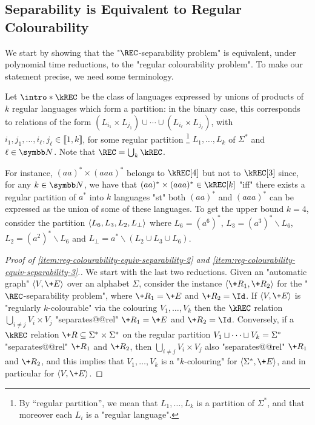 \subsection{Separability is Equivalent to Regular Colourability}

We start by showing that the "$\REC$-separability problem" is equivalent,
under polynomial time reductions, to the "regular colourability problem". To make our statement precise, we need some terminology.

\AP Let $\intro*\kREC$ be the class of languages expressed by unions of products of $k$ regular languages which form a partition: in the binary case, this corresponds to
relations of the form $(L_{i_1} \times L_{j_1}) \cup \dotsb \cup (L_{i_\ell} \times L_{j_\ell})$, with $i_1,j_1,\dotsc,i_\ell, j_\ell \in \lBrack 1,k \rBrack$, for some regular partition%
\footnote{By ``regular partition'',
we mean that $L_1, \dotsc, L_{k}$ is a partition of $\Sigma^*$, and that moreover
each $L_i$ is a "regular language".} $L_1, \dotsc, L_{k}$ of $\Sigma^*$ and $\ell \in \N$.
Note that $\REC = \bigcup_k \kREC$.

\begin{example}
    For instance, $(aa)^* \times (aaa)^*$ belongs to $\kREC[4]$ but not to $\kREC[3]$
    since, for any $k\in \N$, we have that $(aa)^* \times (aaa)^* \in \kREC[k]$ "iff"
    there exists a regular partition of $a^*$ into $k$ languages "st" both
    $(aa)^*$ and $(aaa)^*$ can be expressed as the union of some of these languages.
    To get the
    upper bound $k=4$, consider the partition $\langle L_6, L_3, L_2, L_\bot\rangle$ where $L_6 = (a^6)^*$,
    $L_3 = (a^3)^* \smallsetminus L_6$, $L_2 = (a^2)^* \smallsetminus L_6$ and $L_\bot = a^* \smallsetminus (L_2 \cup L_3 \cup L_6)$.
\end{example}

\regcolourabilityequivseparability%
   
\begin{proof}[Proof of \eqref{item:reg-colourability-equiv-separability-2} and
    \eqref{item:reg-colourability-equiv-separability-3}.]
    We start with the last two reductions.
    Given an "automatic graph" $\tup{V,\+E}$ over an alphabet $\Sigma$, consider the instance
    $\tup{\+R_1, \+R_2}$ for the "$\REC$-separability problem", where 
    $\+R_1 = \+E$ and $\+R_2 = \Id$. 
    If $\tup{V,\+E}$ is "regularly $k$-colourable" via the colouring $V_1, \dotsc, V_k$ then the $\kREC$ relation
    $\bigcup_{i \neq j} V_i \times V_j$ "separates@@rel" $\+R_1 = \+E$ and $\+R_2 = \Id$. 
    Conversely, if a $\kREC$ relation $\+R \subseteq \Sigma^* \times \Sigma^*$ on the regular 
    partition $V_1 \sqcup \dotsb \sqcup V_k = \Sigma^*$ "separates@@rel" $\+R_1$ and $\+R_2$, then $\bigcup_{i \neq j} V_i \times V_j$ also "separates@@rel" $\+R_1$ and $\+R_2$, and this implies that $V_1, \dotsc, V_k$ is a "$k$-colouring" for $\tup{\Sigma^*,\+E}$, and in particular
    for $\tup{V,\+E}$.
\end{proof}

